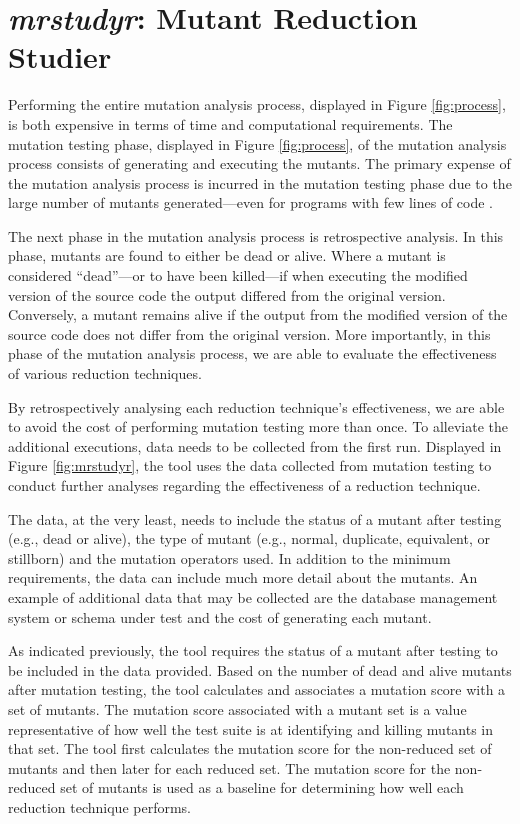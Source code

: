 

\section{\textit{mrstudyr}: Mutant Reduction Studier}

Performing the entire mutation analysis process, displayed in Figure \ref{fig:process},
is both expensive in terms of time and computational requirements. The mutation testing
phase, displayed in Figure \ref{fig:process}, of the mutation analysis
process consists of generating and executing the mutants. The primary
expense of the mutation analysis process is incurred in the mutation testing phase
due to the large number of mutants generated---even for programs with few lines of code \cite{offutt2001mutation}.

The next phase in the mutation analysis process is retrospective analysis. In this
phase, mutants are found to either be dead or alive. Where a mutant is considered
``dead''---or to have been killed---if when executing the modified version of the source
code the output differed from the original version. Conversely, a mutant remains alive
if the output from the modified version of the source code does not differ from the
original version. More importantly, in this phase of the mutation analysis process,
we are able to evaluate the effectiveness of various reduction techniques.

By retrospectively analysing each reduction technique's effectiveness, we are
able to avoid the cost of performing mutation testing more than once. To alleviate
the additional executions, data needs to be collected
from the first run. Displayed in Figure \ref{fig:mrstudyr},
the \mr tool uses the data collected from mutation testing to conduct further analyses
regarding the effectiveness of a reduction technique.

The data, at the very least, needs to include the status of
a mutant after testing (e.g., dead or alive), the type of mutant (e.g., normal, duplicate, equivalent, or stillborn)
and the mutation operators used. In addition to the minimum requirements, the data can include much
more detail about the mutants. An example of additional data that may be collected are the database
management system or schema under test and the cost of generating each mutant.

As indicated previously, the \mr tool requires the status of a mutant after testing to be included
in the data provided.
Based on the number of dead and alive mutants after mutation testing,
the \mr tool calculates and associates a mutation score with a set of mutants.
The mutation score associated with a mutant set is a value representative of how well
the test suite is at identifying and killing mutants in that set. The \mr tool first calculates the
mutation score for the non-reduced set of mutants and then later for each reduced set. The mutation
score for the non-reduced set of mutants is used as a baseline for determining
how well each reduction technique performs.

